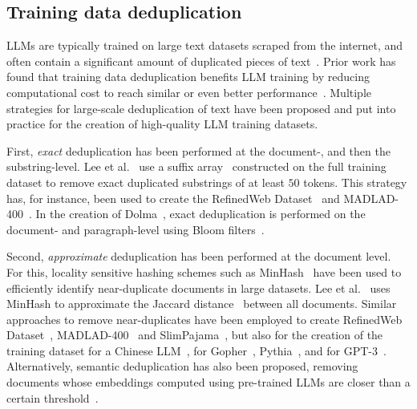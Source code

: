 \subsection{Training data deduplication} 

LLMs are typically trained on large text datasets scraped from the internet, and often contain a significant amount of duplicated pieces of text~\cite{broder1997syntactic, shivakumar1998finding}. Prior work has found that training data deduplication benefits LLM training by reducing computational cost to reach similar or even better performance~\cite{lee2022deduplicating,hernandez2022scaling,allamanis2019adverse,tirumala2024d4,hoffmann2022training,xue2024repeat}. Multiple strategies for large-scale deduplication of text have been proposed and put into practice for the creation of high-quality LLM training datasets. 

First, \emph{exact} deduplication has been performed at the document-, and then the substring-level. Lee et al.~\cite{lee2022deduplicating} use a suffix array~\cite{manber1993suffix} constructed on the full training dataset to remove exact duplicated substrings of at least $50$ tokens. This strategy has, for instance, been used to create the RefinedWeb Dataset~\cite{penedo2023refinedweb} and MADLAD-400~\cite{kudugunta2024madlad}. In the creation of Dolma~\cite{soldaini2024dolma}, exact deduplication is performed on the document- and paragraph-level using Bloom filters~\cite{bloom1970space}. 

Second, \emph{approximate} deduplication has been performed at the document level. For this, locality sensitive hashing schemes such as MinHash~\cite{broder1997resemblance} have been used to efficiently identify near-duplicate documents in large datasets. Lee et al.~\cite{lee2022deduplicating} uses MinHash to approximate the Jaccard distance~\cite{jaccard1912distribution} between all documents. Similar approaches to remove near-duplicates have been employed to create RefinedWeb Dataset~\cite{penedo2023refinedweb}, MADLAD-400~\cite{kudugunta2024madlad} and SlimPajama~\cite{cerebras2023slimpajama}, but also for the creation of the training dataset for a Chinese LLM~\cite{zeng2021pangu}, for Gopher~\cite{rae2021scaling}, Pythia~\cite{biderman2023pythia}, and for GPT-3~\cite{brown2020language}. Alternatively, semantic deduplication has also been proposed, removing documents whose embeddings computed using pre-trained LLMs are closer than a certain threshold~\cite{abbas2023semdedup,kaddour2023minipile}. 
